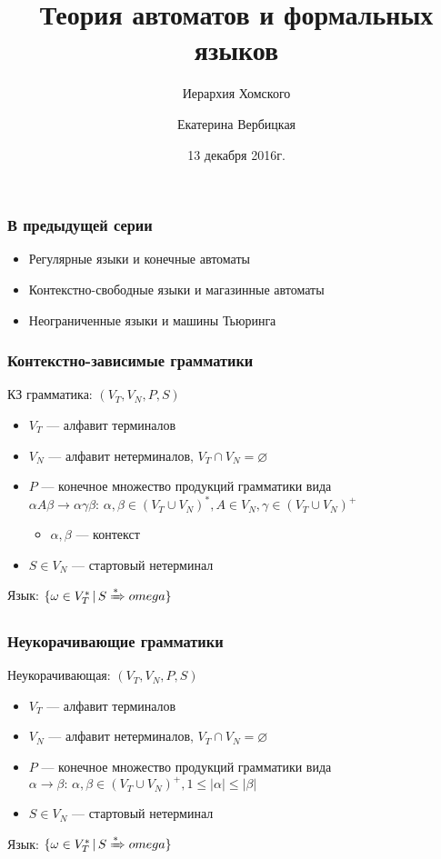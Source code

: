 \documentclass{beamer}
\title[]{Теория автоматов и формальных языков}
\subtitle[]{Иерархия Хомского}
\institute[]{
Санкт-Петербургский государственный электротехнический университет <<ЛЭТИ>>\\
}
\author[]{Екатерина Вербицкая}
\date{13 декабря 2016г.}
\newcommand{\derive}[0]{\xRightarrow[]{*}}
\begin{document}
{
  \begin{frame}
    \titlepage
  \end{frame}
}

\begin{frame}[fragile]
  \transwipe[direction=90]
  \frametitle{В предыдущей серии}
  \begin{itemize}
    \item Регулярные языки и конечные автоматы
    \item Контекстно-свободные языки и магазинные автоматы
    \item Неограниченные языки и машины Тьюринга
  \end{itemize}
\end{frame}

\begin{frame}[fragile]
  \transwipe[direction=90]
  \frametitle{Контекстно-зависимые грамматики}
  КЗ грамматика: $(V_T, V_N, P, S)$
  
  \begin{itemize}
    \item $V_T$ --- алфавит терминалов
    \item $V_N$ --- алфавит нетерминалов, $V_T \cap V_N = \varnothing$
    \item $P$ --- конечное множество продукций грамматики вида $\alpha A \beta \rightarrow \alpha \gamma \beta: \, \alpha, \beta \in (V_T \cup V_N)^*, A \in V_N, \gamma \in (V_T \cup V_N)^+$
    \begin{itemize}
      \item $\alpha, \beta$ --- контекст
    \end{itemize}    
    \item $S \in V_N$ --- стартовый нетерминал
  \end{itemize} 
  
  Язык: $\{ \omega \in V_T^* \, | \, S \derive omega\}$ 
\end{frame}


\begin{frame}[fragile]
  \transwipe[direction=90]
  \frametitle{Неукорачивающие грамматики}
  Неукорачивающая: $(V_T, V_N, P, S)$
  
  \begin{itemize}
    \item $V_T$ --- алфавит терминалов
    \item $V_N$ --- алфавит нетерминалов, $V_T \cap V_N = \varnothing$
    \item $P$ --- конечное множество продукций грамматики вида $\alpha \rightarrow \beta: \, \alpha, \beta \in (V_T \cup V_N)^+, 1 \leq |\alpha| \leq |\beta|$   
    \item $S \in V_N$ --- стартовый нетерминал
  \end{itemize}
  
  Язык: $\{ \omega \in V_T^* \, | \, S \derive omega\}$   
\end{frame}
\end{document}
